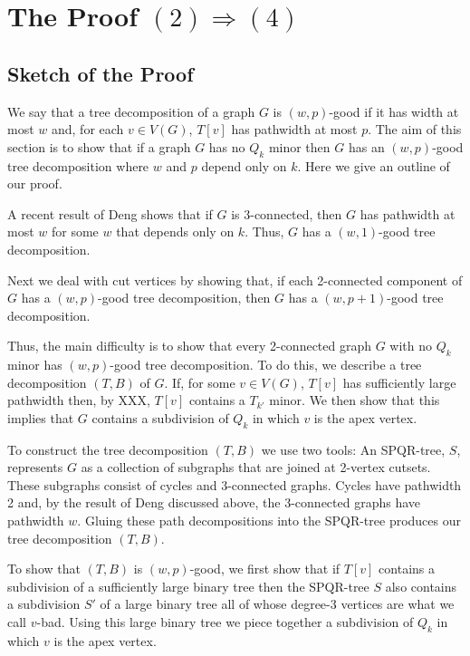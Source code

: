 \documentclass{patmorin}
\begin{document}
\section{The Proof $(2)\Rightarrow(4)$}

\subsection{Sketch of the Proof}

We say that a tree decomposition of a graph $G$ is $(w,p)$-good if it
has width at most $w$ and, for each $v\in V(G)$, $T[v]$ has pathwidth
at most $p$.  The aim of this section is to show that if a graph $G$ has
no $Q_k$ minor then $G$ has an $(w,p)$-good tree decomposition where $w$
and $p$ depend only on $k$. Here we give an outline of our proof.

A recent result of Deng shows that if $G$ is 3-connected, then $G$ has
pathwidth at most $w$ for some $w$ that depends only on $k$.  Thus, $G$
has a $(w,1)$-good tree decomposition.

Next we deal with cut vertices by showing that, if each 2-connected
component of $G$ has a $(w,p)$-good tree decomposition, then $G$ has a
$(w,p+1)$-good tree decomposition.

Thus, the main difficulty is to show that every 2-connected graph $G$
with no $Q_k$ minor has $(w,p)$-good tree decomposition.  To do this,
we describe a tree decomposition $(T,B)$ of $G$. If, for some $v\in
V(G)$, $T[v]$ has sufficiently large pathwidth then, by XXX, $T[v]$
contains a $T_{k'}$ minor.  We then show that this implies that $G$
contains a subdivision of $Q_k$ in which $v$ is the apex vertex.

To construct the tree decomposition $(T,B)$ we use two tools: An
SPQR-tree, $S$, represents $G$ as a collection of subgraphs that are
joined at 2-vertex cutsets.  These subgraphs consist of cycles and
3-connected graphs. Cycles have pathwidth 2 and, by the result of Deng
discussed above, the 3-connected graphs have pathwidth $w$. Gluing these path decompositions into the SPQR-tree produces our tree decomposition $(T,B)$.

To show that $(T,B)$ is $(w,p)$-good, we first show that if $T[v]$
contains a subdivision of a sufficiently large binary tree then the
SPQR-tree $S$ also contains a subdivision $S'$ of a large binary tree
all of whose degree-3 vertices are what we call $v$-bad.  Using this
large binary tree we piece together a subdivision of $Q_k$ in which $v$
is the apex vertex.
\end{document}
